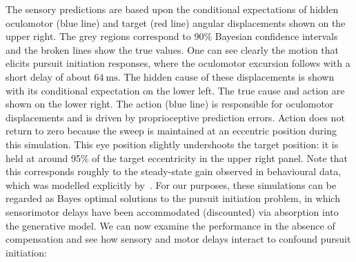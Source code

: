 \documentclass[a4paper]{article} %
\newcommand{\ms}{\si{\milli\second}}%
\begin{document}
The sensory predictions are based upon the conditional expectations of
hidden oculomotor (blue line) and target (red line) angular
displacements shown on the upper right. The grey regions correspond to
90\% Bayesian confidence intervals and the broken lines show the true
values. One can see clearly the motion that elicits pursuit initiation
responses, where the oculomotor excursion follows with a short delay of
about $64~\ms$. The hidden cause of these
displacements is shown with its conditional expectation on the lower
left. The true cause and action are shown on the lower right. The action
(blue line) is responsible for oculomotor displacements and is driven by
proprioceptive prediction errors. %
Action does not return to zero because the sweep is maintained at an eccentric position during this simulation. This eye position slightly undershoots the target position: it is held at around 95\% of the target eccentricity in the upper right panel. Note that this corresponds roughly to the steady-state gain observed in behavioural data, which was modelled explicitly by~\citep{Robinson86}. %
For our purposes, these simulations can be regarded as
Bayes optimal solutions to the pursuit initiation problem, in which
sensorimotor delays have been accommodated (discounted) via absorption
into the generative model. We can now examine the performance in the
absence of compensation and see how sensory and motor delays interact to
confound pursuit initiation:
\end{document}
